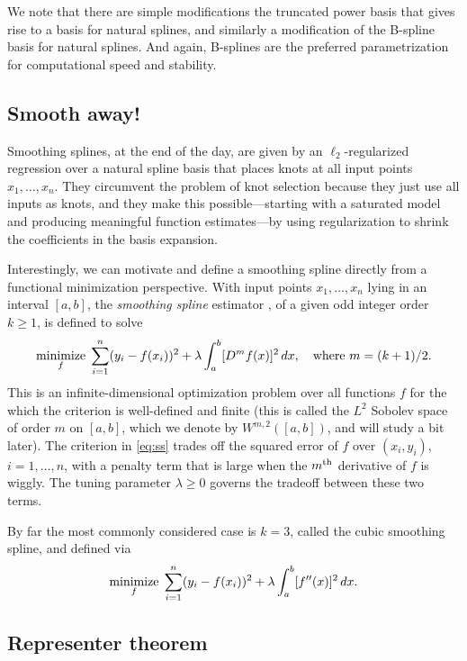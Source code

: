 \documentclass{article}
\begin{document}
We note that there are simple modifications the truncated power basis that gives
rise to a basis for natural splines, and similarly a modification of the
B-spline basis for natural splines. And again, B-splines are the preferred
parametrization for computational speed and stability. 

\subsection{Smooth away!}

Smoothing splines, at the end of the day, are given by an $\ell_2$-regularized
regression over a natural spline basis that places knots at all input points 
$x_1,\dots,x_n$. They circumvent the problem of knot selection because they
just use all inputs as knots, and they make this possible---starting with a 
saturated model and producing meaningful function estimates---by using
regularization to shrink the coefficients in the basis expansion.

Interestingly, we can motivate and define a smoothing spline directly from a
functional minimization perspective. With input points $x_1,\dots,x_n$ lying in 
an interval $[a,b]$, the \emph{smoothing spline} estimator \smash{$\hf$}, of a
given odd integer order $k \geq 1$, is defined to solve   
\begin{equation}
\label{eq:ss}
\mathop{\mathrm{minimize}}_f \; \sum_{i=1}^n (y_i - f(x_i))^2 + \lambda \int_a^b [D^m f(x)]^2 \,
dx, \quad \text{where $m=(k+1)/2$}.
\end{equation}
This is an infinite-dimensional optimization problem over all functions $f$ for
the which the criterion is well-defined and finite (this is called the $L^2$
Sobolev space of order $m$ on $[a,b]$, which we denote by $W^{m,2}([a,b])$, and
will study a bit later). The criterion in \eqref{eq:ss} trades off the squared
error of $f$ over $(x_i,y_i)$, $i=1,\dots,n$, with a penalty term that is large
when the $m^{\text{th}}$ derivative of $f$ is wiggly. The tuning parameter $\lambda \geq 
0$ governs the tradeoff between these two terms. 

By far the most commonly considered case is $k=3$, called the cubic smoothing
spline, and defined via
\begin{equation}
\label{eq:ss3}
\mathop{\mathrm{minimize}}_f \; \sum_{i=1}^n (y_i - f(x_i))^2 + \lambda \int_a^b [f''(x)]^2 \, dx.
\end{equation}

\subsection{Representer theorem}
\end{document}
